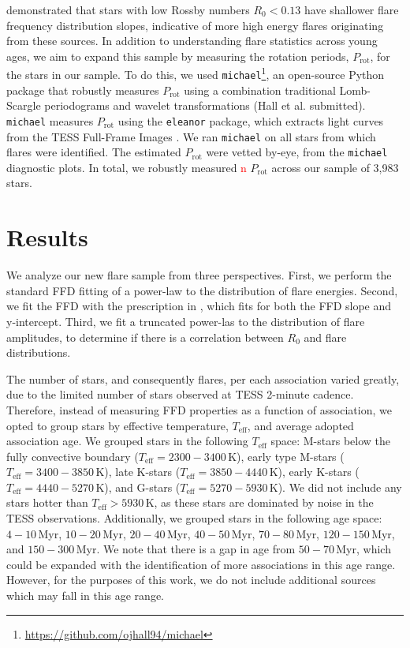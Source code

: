\documentclass[twocolumn]{aastex631}
\begin{document}
\cite{seligman22} demonstrated that stars with low Rossby numbers $R_0 < 0.13$ have
shallower flare frequency distribution slopes, indicative of more high energy flares
originating from these sources. In addition to understanding flare statistics across
young ages, we aim to expand this sample by measuring the rotation periods, $P_\textrm{rot}$,
for the stars in our sample. To do this, we used \texttt{michael}\footnote{\url{https://github.com/ojhall94/michael}},
an open-source Python package that robustly measures $P_\textrm{rot}$ using a combination
traditional Lomb-Scargle periodograms and wavelet transformations (Hall et al. submitted).
\texttt{michael} measures $P_\textrm{rot}$ using the \texttt{eleanor} package, which
extracts light curves from the TESS Full-Frame Images \citep[FFIs;][]{feinstein19}.
We ran \texttt{michael} on all stars from which flares were identified. The estimated
$P_\textrm{rot}$ were vetted by-eye, from the \texttt{michael} diagnostic plots. In
total, we robustly measured \textcolor{red}{n} $P_\textrm{rot}$ across our sample of
3,983 stars.


\section{Results}\label{sec:results}

We analyze our new flare sample from three perspectives. First, we perform the standard
FFD fitting of a power-law to the distribution of flare energies. Second, we fit the FFD with the
prescription in \cite{gershberg72}, which fits for both the FFD slope and y-intercept.
Third, we fit a truncated power-las to the distribution of flare amplitudes, to determine
if there is a correlation between $R_0$ and flare distributions.

The number of stars, and consequently flares, per each association varied greatly,
due to the limited number of stars observed at TESS 2-minute cadence. Therefore, instead
of measuring FFD properties as a function of association, we opted to group stars
by effective temperature, $T_\textrm{eff}$, and average adopted association age. We
grouped stars in the following $T_\textrm{eff}$ space: M-stars below the fully
convective boundary ($T_\textrm{eff} = 2300 - 3400$\,K), early type M-stars
($T_\textrm{eff} = 3400 - 3850$\,K), late K-stars ($T_\textrm{eff} = 3850 - 4440$\,K),
early K-stars ($T_\textrm{eff} = 4440 - 5270$\,K), and G-stars ($T_\textrm{eff} = 5270 - 5930$\,K).
We did not include any stars hotter than $T_\textrm{eff} > 5930$\,K, as these stars
are dominated by noise in the TESS observations. Additionally, we grouped stars
in the following age space: $4-10$\,Myr, $10-20$\,Myr, $20-40$\,Myr, $40-50$\,Myr,
$70-80$\,Myr, $120-150$\,Myr, and $150-300$\,Myr. We note that there is a gap in
age from $50-70$\,Myr, which could be expanded with the identification of more
associations in this age range. However, for the purposes of this work, we do not
include additional sources which may fall in this age range.
\end{document}
